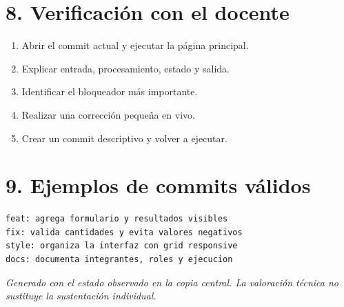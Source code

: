\documentclass[10pt,a4paper]{article}
\begin{document}
\section*{8. Verificación con el docente}
\begin{enumerate}
\item Abrir el commit actual y ejecutar la página principal.
\item Explicar entrada, procesamiento, estado y salida.
\item Identificar el bloqueador más importante.
\item Realizar una corrección pequeña en vivo.
\item Crear un commit descriptivo y volver a ejecutar.
\end{enumerate}
\section*{9. Ejemplos de commits válidos}
\begin{lstlisting}
feat: agrega formulario y resultados visibles
fix: valida cantidades y evita valores negativos
style: organiza la interfaz con grid responsive
docs: documenta integrantes, roles y ejecucion
\end{lstlisting}
\vfill
{\small\textit{Generado con el estado observado en la copia central. La valoración técnica no sustituye la sustentación individual.}}
\end{document}
